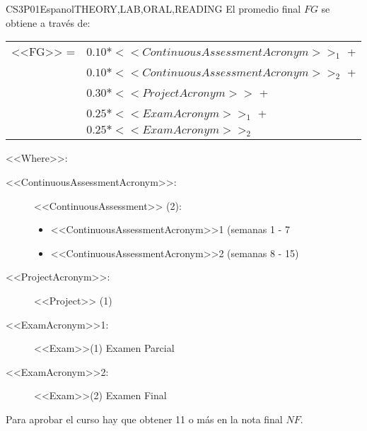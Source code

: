     \begin{evaluation}{CS3P01}{Espanol}{THEORY,LAB,ORAL,READING}
    El promedio final $FG$ se obtiene a través de:
   
    \begin{tabular}{cl}
        <<FG>> = & $0.10*<<ContinuousAssessmentAcronym>>_{1}$ +\\
                 & $0.10*<<ContinuousAssessmentAcronym>>_{2}$ +\\
                 & $0.30*<<ProjectAcronym>>$ + \\
                 & $0.25*<<ExamAcronym>>_{1}$ + \\
                 & $0.25*<<ExamAcronym>>_{2}$
    \end{tabular}
   
    \noindent <<Where>>:
    \begin{description}
    \item[<<ContinuousAssessmentAcronym>>:] <<ContinuousAssessment>> (2):
         \begin{itemize}
               \item  <<ContinuousAssessmentAcronym>>1 (semanas 1 - 7
                \item <<ContinuousAssessmentAcronym>>2 (semanas 8 - 15) 
         \end{itemize}
     \item[<<ProjectAcronym>>:]  <<Project>> (1)
     \item[<<ExamAcronym>>1:] <<Exam>>(1) Examen Parcial
     \item[<<ExamAcronym>>2:] <<Exam>>(2) Examen Final
    \end{description}
    \noindent Para aprobar el curso hay que obtener 11 o más en la nota final $NF$.
    \end{evaluation}
   
